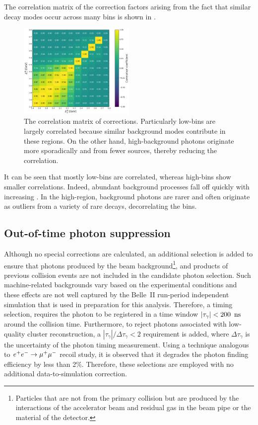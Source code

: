 The correlation matrix of the correction factors arising from the fact that similar decay modes occur across many bins is shown in .
\begin{figure}[htbp!]
    \centering
    \includegraphics[width=0.5\textwidth]{figures/data_sim_corrections/bbar_correlation_matrix.pdf}
    \caption{\label{fig:bbar_correlation_matrix} The correlation matrix of \BB corrections.
    Particularly low-\EB bins are largely correlated because similar background modes contribute in these regions.
    On the other hand, high-\EB background photons originate more sporadically and from fewer sources, thereby reducing the correlation.
    }
\end{figure}
It can be seen that mostly low-\EB bins are correlated, whereas high-\EB bins show smaller correlations.
Indeed, abundant background processes fall off quickly with increasing \EB.
In the high-\EB region, background photons are rarer and often originate as outliers from a variety of rare decays, decorrelating the bins.

\subsection{Out-of-time photon suppression}\label{sec:out_of_time_photon_suppression}

Although no special corrections are calculated, an additional selection is added to ensure that photons produced by the beam background\footnote{
Particles that are not from the primary collision but are produced by the interactions of the accelerator beam 
and residual gas in the beam pipe or the material of the detector.},
and products of previous collision events are not included in the candidate photon selection.
Such machine-related backgrounds vary based on the experimental conditions and these effects are not well captured by the Belle~II run-period independent simulation that is used in preparation for this analysis.
Therefore, a timing selection, requires the photon to be registered in a time window $|\tau_{\gamma}|<200~{\rm \,ns}$ around the collision time.
Furthermore, to reject photons associated with low-quality cluster reconstruction, a $|\tau_{\gamma}|/\Delta\tau_{\gamma}<2$ requirement is added, 
where $\Delta\tau_{\gamma}$ is the uncertainty of the photon timing measurement.
Using a technique analogous to $e^+e^-\rightarrow\mu^+\mu^-$ recoil study, it is observed that it degrades the photon finding efficiency by less than 2\%.
Therefore, these selections are employed with no additional data-to-simulation correction.